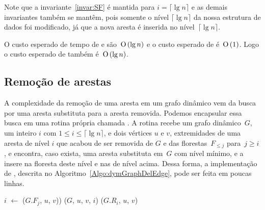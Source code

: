 Note que a invariante~\ref{invar:SF} é mantida para $i = \lceil \lg n \rceil$ e as demais invariantes também se mantêm, pois somente o nível $\lceil \lg n \rceil$ da nossa estrutura de dados foi modificado, já que a nova aresta é inserida no nível~$\lceil \lg n \rceil$. 

O custo esperado de tempo de \dymForestQuery{} e \dymGraphAddEdge{} são~$\text{O}\left(\lg n\right)$ e o custo esperado de \graphAdd{} é~$\text{O}\left(1\right)$. Logo o custo esperado de \dymGraphAddEdge{} também é~$\text{O}\left(\lg n\right)$.

\subsection{Remoção de arestas}

\newcommand{\ceil}[1]{\lceil{#1}\rceil}

A complexidade da remoção de uma aresta em um grafo dinâmico vem da busca por uma aresta substituta para a aresta removida. Podemos encapsular essa busca em uma rotina própria chamada . A rotina \dymGraphReplace{} recebe um grafo dinâmico~$G$, um inteiro $i$ com $1 \leq i \leq \ceil{\lg n}$, e dois vértices $u$ e $v$, extremidades de uma aresta de nível $i$ que acabou de ser removida de $G$ e das florestas~$F_{\leqslant j}$ para~$j \geq i$, e encontra, caso exista, uma aresta substituta em~$G$ com nível mínimo, e a insere na floresta deste nível e nas de nível acima. Dessa forma, a implementação de \dymGraphDelEdge{}, descrita no Algoritmo~\ref{Algo:dymGraphDelEdge}, pode ser feita em poucas linhas.

\begin{algorithm}
\caption{\dymGraphDelEdge($G$, $u$, $v$)}
\label{Algo:dymGraphDelEdge}
\begin{algorithmic}[1]
\State $i$ $\gets$ \nivel[$u,v$]
\label{Algo:dymGraphDelEdge:linha:if}
\label{linha2}
\State \dymForestDelEdge($G$.$F_j$, $u$, $v$))
\EndFor
\State \dymGraphReplace($G$, $u$, $v$, $i$)
\Else
  \State \graphDel($G$.$R_i$, $u$, $v$)\label{Algo:dymGraphDelEdge:linha:removeLA}
\EndIf
\end{algorithmic}
\end{algorithm}

